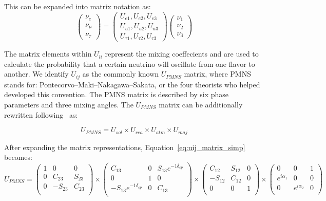 This can be expanded into matrix notation as:
\begin{equation}~\label{eq:mass_eigenstates}
\begin{pmatrix}
\nu_e\\
\nu_{\mu}\\
\nu_{\tau}
\end{pmatrix}
=
\begin{pmatrix}
U_{e1}, U_{e2}, U_{e3} \\
U_{u1}, U_{u2}, U_{u3} \\
U_{\tau1}, U_{\tau2}, U_{\tau3}
\end{pmatrix}
\begin{pmatrix}
\nu_1\\
\nu_2\\
\nu_3
\end{pmatrix}
\end{equation}

The matrix elements within $U_{li}$ represent the mixing coeffecients and are used to calculate the probability that a certain neutrino will oscillate from one flavor to another.
We identify $U_{ij}$ as the commonly known $U_{PMNS}$ matrix, where PMNS stands for: Pontecorvo–Maki–Nakagawa–Sakata, or the four theorists who helped developed this convention.
The PMNS matrix is described by six phase parameters and three mixing angles.
The $U_{PMNS}$ matrix can be additionally rewritten following~\citep{Pontecorvo:1957qd, 1962PThPh..28..870M} as:

\begin{equation}~\label{eq:uij_matrix_simp}
U_{PMNS}
=
U_{sol} \times U_{rea} \times U_{atm} \times U_{maj}
\end{equation}

After expanding the matrix representations, Equation~\ref{eq:uij_matrix_simp} becomes:
\begin{equation}
U_{PMNS}
=
\begin{pmatrix}
1 & 0 & 0 \\
0 & C_{23} & S_{23} \\
0 & -S_{23} & C_{23} \\
\end{pmatrix}
\times
\begin{pmatrix}
C_{13} & 0 & S_{13}e^{-1\delta_{cp}} \\
0 & 1 & 0 \\
-S_{13}e^{-1\delta_{cp}} & 0 & C_{13} \\
\end{pmatrix}
\times
\begin{pmatrix}
C_{12} & S_{12} & 0 \\
-S_{12} & C_{12} & 0 \\
0 & 0 & 1 \\
\end{pmatrix}
\times
\begin{pmatrix}
0 & 0 & 1 \\
e^{i\alpha_{1}} & 0 & 0 \\
0 & e^{i\alpha_{2}} & 0 \\
\end{pmatrix}
\end{equation}

